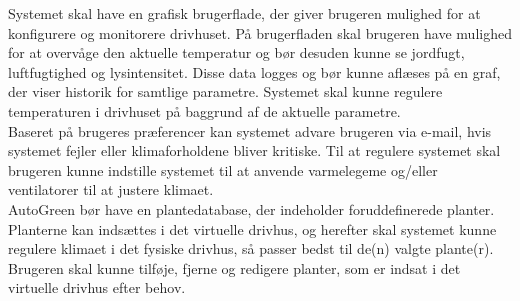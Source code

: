 Systemet skal have en grafisk brugerflade, der giver brugeren mulighed for at konfigurere og monitorere drivhuset. På brugerfladen skal brugeren have mulighed for at overvåge den aktuelle temperatur og bør desuden kunne se jordfugt, luftfugtighed og lysintensitet. Disse data logges og bør kunne aflæses på en graf, der viser historik for samtlige parametre. Systemet skal kunne regulere temperaturen i drivhuset på baggrund af de aktuelle parametre.\\
Baseret på brugeres præferencer kan systemet advare brugeren via e-mail, hvis systemet fejler eller klimaforholdene bliver kritiske. Til at regulere systemet skal brugeren kunne indstille systemet til at anvende varmelegeme og/eller ventilatorer til at justere klimaet. \\
AutoGreen bør have en plantedatabase, der indeholder foruddefinerede planter. Planterne kan indsættes i det virtuelle drivhus, og herefter skal systemet kunne regulere klimaet i det fysiske drivhus, så passer bedst til de(n) valgte plante(r). Brugeren skal kunne tilføje, fjerne og redigere planter, som er indsat i det virtuelle drivhus efter behov.

\clearpage